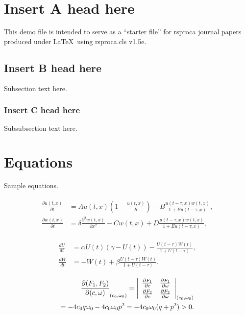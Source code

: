 \documentclass[]{rsos}%
\begin{document}
\begin{fmtext}
\section{Insert A head here}

This demo file is intended to serve as a ``starter file''
for rsproca journal papers produced under \LaTeX\ using
rsproca.cls v1.5e.

\subsection{Insert B head here}
Subsection text here.

\subsubsection{Insert C head here}
Subsubsection text here.

\section{Equations}

Sample equations. \cite{1}\cite{1,2} \cite{1,2,3}

\begin{align}\label{1.1}
\begin{split}
\frac{\partial u(t,x)}{\partial t} &= Au(t,x) \left(1-\frac{u(t,x)}{K}\right)-B\frac{u(t-\tau,x) w(t,x)}{1+Eu(t-\tau,x)},\\
\frac{\partial w(t,x)}{\partial t} &=\delta \frac{\partial^2w(t,x)}{\partial x^2}-Cw(t,x)+D\frac{u(t-\tau,x)w(t,x)}{1+Eu(t-\tau,x)},
\end{split}
\end{align}

\begin{align}\label{1.2}
\begin{split}
\frac{dU}{dt} &=\alpha U(t)(\gamma -U(t))-\frac{U(t-\tau)W(t)}{1+U(t-\tau)},\\
\frac{dW}{dt} &=-W(t)+\beta\frac{U(t-\tau)W(t)}{1+U(t-\tau)}.
\end{split}
\end{align}

\begin{eqnarray}
\frac{\partial(F_1,F_2)}{\partial(c,\omega)}_{(c_0,\omega_0)} = \left|
\begin{array}{ll}
\frac{\partial F_1}{\partial c} &\frac{\partial F_1}{\partial \omega} \\\noalign{\vskip3pt}
\frac{\partial F_2}{\partial c}&\frac{\partial F_2}{\partial \omega}
\end{array}\right|_{(c_0,\omega_0)}\notag\\
=-4c_0q\omega_0 -4c_0\omega_0p^2 =-4c_0\omega_0(q+p^2)>0.
\end{eqnarray}
\end{fmtext}
\end{document}
